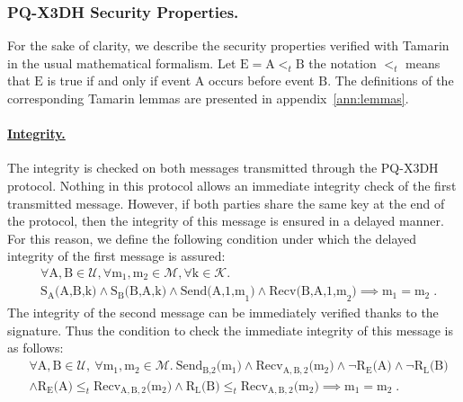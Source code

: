 \subsubsection{PQ-X3DH Security Properties.} For the sake of clarity, we 
describe the security properties verified with Tamarin in the usual 
mathematical formalism. Let $\text{E} = \text{A} <_t \text{B}$ the notation 
$<_t$ means that $\text{E}$ is true if and only if event $\text{A}$ occurs 
before event $\text{B}$. 
The definitions of the corresponding Tamarin lemmas 
are presented in appendix~\ref{ann:lemmas}.

\paragraph{\underline{Integrity.}} The integrity is checked on both messages transmitted through the PQ-X3DH protocol. Nothing in this protocol allows an immediate integrity check of the first transmitted message. However, if both parties share the same key at the end of the protocol, then the integrity of this message is ensured in a delayed manner. For this reason, we define the following condition under which the delayed integrity of the first message is assured:
\begin{align*}
    & \forall \text{A},\text{B} \in \mathcal{U}, \forall \text{m}_\text{1},\text{m}_\text{2} \in \mathcal{M}, \forall \text{k} \in \mathcal{K} . \\
    & \text{S}_\text{A}\text{(A,B,k)} \land \text{S}_\text{B}\text{(B,A,k)} \land \text{Send(A,1,m}_\text{1}\text{)} \land \text{Recv(B,A,1,m}_\text{2}\text{)}
    \implies \text{m}_\text{1} = \text{m}_\text{2} \; .
\end{align*}
The integrity of the second message can be immediately verified thanks to the signature. Thus the condition to check the immediate integrity of this message is as follows:
\begin{align*}
& \forall \text{A},\text{B} \in \mathcal{U},\  \forall \text{m}_\text{1},\text{m}_\text{2} \in \mathcal{M}.
    ~\text{Send}_{\text{B},\text{2}}\text{(}\text{m}_\text{1}\text{)} \land \text{Recv}_{\text{A},\text{B},\text{2}}\text{(}\text{m}_\text{2}\text{)} \land \lnot \text{R}_\text{E}\text{(A)} \land \lnot \text{R}_\text{L}\text{(B)} \\
    & \land \text{R}_\text{E}\text{(A)} \leq_t \text{Recv}_{\text{A},\text{B},\text{2}}\text{(}\text{m}_\text{2}\text{)} \land \text{R}_\text{L}\text{(B)} \leq_t \text{Recv}_{\text{A},\text{B},\text{2}}\text{(}\text{m}_\text{2}\text{)}
    \implies \text{m}_\text{1} = \text{m}_\text{2} \; .
\end{align*}

